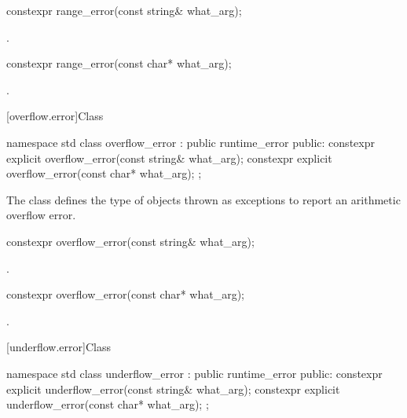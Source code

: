 %
\begin{itemdecl}
constexpr range_error(const string& what_arg);
\end{itemdecl}

\begin{itemdescr}
\pnum
\ensures
{}.
\end{itemdescr}

%
\begin{itemdecl}
constexpr range_error(const char* what_arg);
\end{itemdecl}

\begin{itemdescr}
\pnum
\ensures
{}.
\end{itemdescr}

[overflow.error]{Class }

%
\begin{codeblock}
namespace std {
  class overflow_error : public runtime_error {
  public:
    constexpr explicit overflow_error(const string& what_arg);
    constexpr explicit overflow_error(const char* what_arg);
  };
}
\end{codeblock}

\pnum
The class
defines the type of objects thrown as exceptions to report an arithmetic overflow error.

%
\begin{itemdecl}
constexpr overflow_error(const string& what_arg);
\end{itemdecl}

\begin{itemdescr}
\pnum
\ensures
{}.
\end{itemdescr}

%
\begin{itemdecl}
constexpr overflow_error(const char* what_arg);
\end{itemdecl}

\begin{itemdescr}
\pnum
\ensures
{}.
\end{itemdescr}

[underflow.error]{Class }

%
\begin{codeblock}
namespace std {
  class underflow_error : public runtime_error {
  public:
    constexpr explicit underflow_error(const string& what_arg);
    constexpr explicit underflow_error(const char* what_arg);
  };
}
\end{codeblock}

